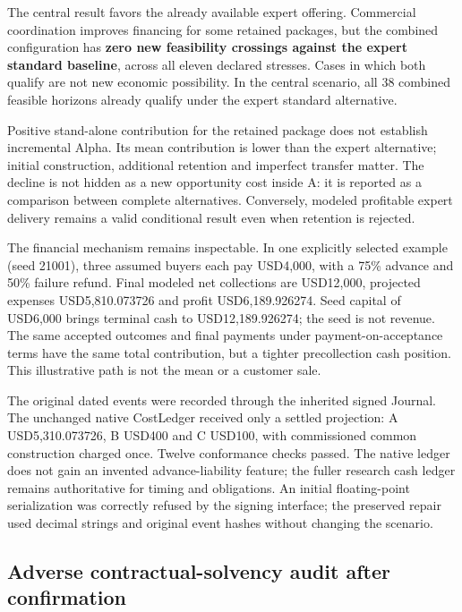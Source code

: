\documentclass[
  11pt,
]{article}
\let\OriginalSubsection\subsection
\renewcommand{\subsection}{\needspace{6\baselineskip}\OriginalSubsection}
\begin{document}
The central result favors the already available expert offering.
Commercial coordination improves financing for some retained packages,
but the combined configuration has \textbf{zero new feasibility
crossings against the expert standard baseline}, across all eleven
declared stresses. Cases in which both qualify are not new economic
possibility. In the central scenario, all 38 combined feasible horizons
already qualify under the expert standard alternative.

Positive stand-alone contribution for the retained package does not
establish incremental Alpha. Its mean contribution is lower than the
expert alternative; initial construction, additional retention and
imperfect transfer matter. The decline is not hidden as a new
opportunity cost inside A: it is reported as a comparison between
complete alternatives. Conversely, modeled profitable expert delivery
remains a valid conditional result even when retention is rejected.

The financial mechanism remains inspectable. In one explicitly selected
example (seed 21001), three assumed buyers each pay USD4,000, with a
75\% advance and 50\% failure refund. Final modeled net collections are
USD12,000, projected expenses USD5,810.073726 and profit
USD6,189.926274. Seed capital of USD6,000 brings terminal cash to
USD12,189.926274; the seed is not revenue. The same accepted outcomes
and final payments under payment-on-acceptance terms have the same total
contribution, but a tighter precollection cash position. This
illustrative path is not the mean or a customer sale.

The original dated events were recorded through the inherited signed
Journal. The unchanged native CostLedger received only a settled
projection: A USD5,310.073726, B USD400 and C USD100, with commissioned
common construction charged once. Twelve conformance checks passed. The
native ledger does not gain an invented advance-liability feature; the
fuller research cash ledger remains authoritative for timing and
obligations. An initial floating-point serialization was correctly
refused by the signing interface; the preserved repair used decimal
strings and original event hashes without changing the scenario.

\hypertarget{adverse-contractual-solvency-audit-after-confirmation}{%
\subsection{Adverse contractual-solvency audit after
confirmation}\label{adverse-contractual-solvency-audit-after-confirmation}}
\end{document}
